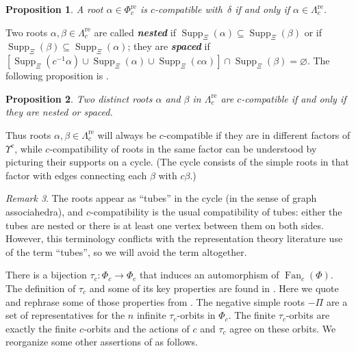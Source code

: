 \documentclass{amsart}
\newtheorem{proposition}{Proposition}[section]
\theoremstyle{definition}
\theoremstyle{remark}
\newtheorem{remark}[proposition]{Remark}
\numberwithin{equation}{section}
\newcommand{\newword}[1]{\textbf{\emph{#1}}}
\newcommand{\0}{{\mathbf{0}}}
\newcommand{\Fan}{\operatorname{Fan}}
\newcommand{\re}{\mathrm{re}}
\newcommand{\RSChar}{\Phi}
\newcommand{\RS}{\RSChar}
\newcommand{\SimplesChar}{\Pi}
\newcommand{\Simples}{\SimplesChar}
\newcommand{\RSTChar}{\Upsilon}
\newcommand{\RST}[1]{\RSTChar^{#1}}
\newcommand{\SimplesTChar}{\Xi}
\newcommand{\SuppT}{\operatorname{Supp}_\SimplesTChar}
\newcommand{\AP}[1]{\RS_{#1}}
\newcommand{\APre}[1]{\AP{#1}^\re}
\newcommand{\APTChar}{\Lambda}
\newcommand{\APT}[1]{\APTChar_{#1}}
\newcommand{\APTre}[1]{\APT{#1}^\re}
\begin{document}
\begin{proposition}\label{delta c compat}
A root $\alpha\in\APre{c}$ is $c$-compatible with~$\delta$ if and only if $\alpha\in\APTre{c}$.
\end{proposition}

Two roots $\alpha,\beta\in\APTre{c}$ are called \newword{nested} if $\SuppT(\alpha)\subseteq\SuppT(\beta)$ or if $\SuppT(\beta)\subseteq\SuppT(\alpha)$; they are \newword{spaced} if $[\SuppT(c^{-1}\alpha)\cup\SuppT(\alpha)\cup\SuppT(c\alpha)]\cap\SuppT(\beta)=\varnothing$.
The following proposition is \cite[Proposition~5.12]{affdenom}.

\begin{proposition}\label{compatible in tubes}
Two distinct roots $\alpha$ and $\beta$ in $\APTre{c}$ are $c$-compatible if and only if they are nested or spaced.
\end{proposition}

Thus roots $\alpha,\beta\in\APTre{c}$ will always be $c$-compatible if they are in different factors of $\RST{c}$, while
$c$-compatibility of roots in the same factor can be understood by picturing their supports on a cycle.
(The cycle consists of the simple roots in that factor with edges connecting each $\beta$ with $c\beta$.)

\begin{remark}
  The roots appear as ``tubes'' in the cycle (in the sense of graph associahedra), and $c$-compatibility is the usual compatibility of tubes:
  either the tubes are nested or there is at least one vertex between them on both sides.
  However, this terminology conflicts with the representation theory literature use of the term ``tubes'', so we will avoid the term altogether.
\end{remark}

There is a bijection $\tau_c:\AP{c}\to\AP{c}$ that induces an automorphism of $\Fan_c(\RS)$.
The definition of $\tau_c$ and some of its key properties are found in \cite[Section~3]{affdenom}.
Here we quote and rephrase some of those properties from \cite[Proposition~3.12]{affdenom}.
The negative simple roots $-\Simples$ are a set of representatives for the $n$ infinite $\tau_c$-orbits in $\AP{c}$.
The finite $\tau_c$-orbits are exactly the finite $c$-orbits and the actions of $c$ and $\tau_c$ agree on these orbits.
We reorganize some other assertions of \cite[Proposition~3.12]{affdenom} as follows.
\end{document}
